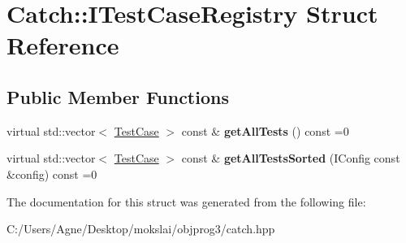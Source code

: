 \hypertarget{struct_catch_1_1_i_test_case_registry}{}\section{Catch\+:\+:I\+Test\+Case\+Registry Struct Reference}
\label{struct_catch_1_1_i_test_case_registry}
\subsection*{Public Member Functions}
\begin{DoxyCompactItemize}
\item 
\mbox{\label{struct_catch_1_1_i_test_case_registry_ad6e4d4a621655123f73ae98cfeda063d}} 
virtual std\+::vector$<$ \mbox{\hyperlink{class_catch_1_1_test_case}{Test\+Case}} $>$ const  \& {\bfseries get\+All\+Tests} () const =0
\item 
\mbox{\label{struct_catch_1_1_i_test_case_registry_a33e46639d0319d35497c05bb5d02be5a}} 
virtual std\+::vector$<$ \mbox{\hyperlink{class_catch_1_1_test_case}{Test\+Case}} $>$ const  \& {\bfseries get\+All\+Tests\+Sorted} (I\+Config const \&config) const =0
\end{DoxyCompactItemize}


The documentation for this struct was generated from the following file\+:\begin{DoxyCompactItemize}
\item 
C\+:/\+Users/\+Agne/\+Desktop/mokslai/objprog3/catch.\+hpp\end{DoxyCompactItemize}
